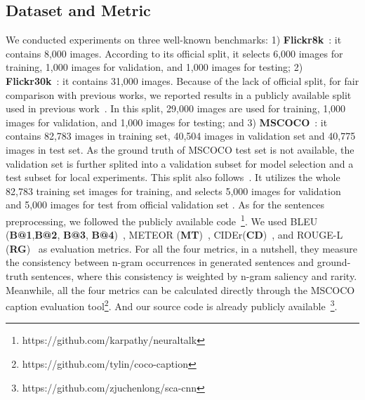 \documentclass[10pt,twocolumn,letterpaper]{article}
\begin{document}
\subsection{Dataset and Metric}
We conducted experiments on three well-known benchmarks: 1) \textbf{Flickr8k}~\cite{hodosh2013framing}: it contains 8,000 images. According to its official
split, it selects 6,000 images for training, 1,000 images for validation, and 1,000 images for testing; 2) \textbf{Flickr30k}~\cite{young2014image}: it
contains 31,000 images. Because of the lack of official split, for fair comparison with previous works, we reported results in a publicly available split used
in previous work~\cite{karpathy2015deep}. In this split, 29,000 images are used for training, 1,000 images for validation, and 1,000 images for testing; and
3) \textbf{MSCOCO}~\cite{lin2014microsoft}: it contains 82,783 images in training set, 40,504 images in validation set and 40,775 images in test set. As the
ground truth of MSCOCO test set is not available, the validation set is further splited into a validation subset for model selection and a test subset for
local experiments. This split also follows~\cite{karpathy2015deep}. It utilizes the whole 82,783 training set images for training, and selects 5,000 images
for validation and 5,000 images for test from official validation set .
As for the sentences preprocessing, we followed the publicly available code~\footnote{https://github.com/karpathy/neuraltalk}.
We used BLEU (\textbf{B@1},\textbf{B@2}, \textbf{B@3}, \textbf{B@4})~\cite{papineni2002bleu}, METEOR (\textbf{MT})~\cite{banerjee2005meteor},
CIDEr(\textbf{CD})~\cite{vedantam2015cider}, and ROUGE-L (\textbf{RG})~\cite{lin2004rouge} as evaluation metrics. For all the four metrics, in a nutshell,
they measure the consistency between n-gram occurrences in generated sentences and ground-truth sentences, where this consistency is weighted by n-gram
saliency and rarity. Meanwhile, all the four metrics can be calculated directly through the MSCOCO caption evaluation
tool\footnote{https://github.com/tylin/coco-caption}. And our source code is already publicly available~\footnote{https://github.com/zjuchenlong/sca-cnn}.
\end{document}
